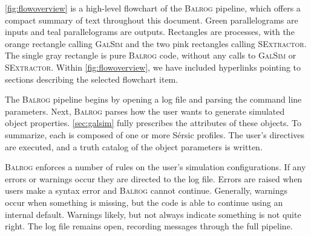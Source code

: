 \documentclass[11pt]{book}
\newcommand{\galsim}{\textsc{GalSim}}
\newcommand{\balrog}{\textsc{Balrog}}
\newcommand{\sex}{\textsc{SExtractor}}
\newcommand{\sersic}{S\'{e}rsic}
\begin{document}
\autoref{fig:flowoverview} is a high-level flowchart of the \balrog{} pipeline, 
which offers a compact summary of text throughout this document.
Green parallelograms are inputs and teal parallelograms are outputs.
Rectangles are processes, with the orange rectangle calling \galsim{} and the two pink rectangles calling \sex{}.
The single gray rectangle is pure \balrog{} code, without any calls to \galsim{} or \sex{}.
Within \autoref{fig:flowoverview}, we have included hyperlinks pointing to sections describing the selected flowchart item.






The \balrog{}  pipeline begins by opening a log file and parsing the command line parameters.
Next, \balrog{} parses how the user wants to generate simulated object properties.
\autoref{sec:galsim} fully prescribes the attributes of these objects.
To summarize, each is composed of one or more \sersic{} profiles.
The user's directives are executed, and a truth catalog of the object parameters is written.

\balrog{} enforces a number of rules on the user's simulation configurations.
If any errors or warnings occur they are directed to the log file. 
Errors are raised when users make a syntax error and \balrog{} cannot continue.
Generally, warnings occur when something is missing, but the code is able to continue using an internal default. 
Warnings likely, but not always indicate something is not quite right.
The log file remains open, recording messages through the full pipeline.
\end{document}
